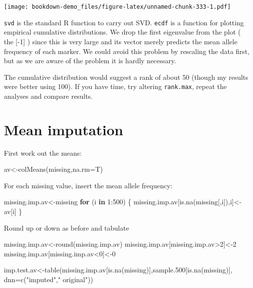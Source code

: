 \documentclass[
]{book}
\newenvironment{Shaded}{\begin{snugshade}}{\end{snugshade}}
\newcommand{\AttributeTok}[1]{\textcolor[rgb]{0.77,0.63,0.00}{#1}}
\newcommand{\ControlFlowTok}[1]{\textcolor[rgb]{0.13,0.29,0.53}{\textbf{#1}}}
\newcommand{\DecValTok}[1]{\textcolor[rgb]{0.00,0.00,0.81}{#1}}
\newcommand{\FloatTok}[1]{\textcolor[rgb]{0.00,0.00,0.81}{#1}}
\newcommand{\FunctionTok}[1]{\textcolor[rgb]{0.00,0.00,0.00}{#1}}
\newcommand{\NormalTok}[1]{#1}
\newcommand{\OtherTok}[1]{\textcolor[rgb]{0.56,0.35,0.01}{#1}}
\newcommand{\SpecialCharTok}[1]{\textcolor[rgb]{0.00,0.00,0.00}{#1}}
\newcommand{\StringTok}[1]{\textcolor[rgb]{0.31,0.60,0.02}{#1}}
\begin{document}
\texttt{[image: bookdown-demo\_files/figure-latex/unnamed-chunk-333-1.pdf]}

\texttt{svd} is the standard R function to carry out SVD. \texttt{ecdf} is a function for plotting empirical cumulative distributions. We drop the first eigenvalue from the plot ( the {[}-1{]} ) since this is very large and its vector merely predicts the mean allele frequency of each marker. We could avoid this problem by rescaling the data first, but as we are aware of the problem it is hardly necessary.

The cumulative distribution would suggest a rank of about 50 (though my results were better using 100). If you have time, try altering \texttt{rank.max}, repeat the analyses and compare results.

\hypertarget{mean-imputation}{%
\section{Mean imputation}\label{mean-imputation}}

First work out the means:

\begin{Shaded}
\begin{Highlighting}[]
\NormalTok{av}\OtherTok{\textless{}{-}}\FunctionTok{colMeans}\NormalTok{(missing,}\AttributeTok{na.rm=}\NormalTok{T)   }
\end{Highlighting}
\end{Shaded}

For each missing value, insert the mean allele frequency:

\begin{Shaded}
\begin{Highlighting}[]
\NormalTok{missing.imp.av}\OtherTok{\textless{}{-}}\NormalTok{missing }
\ControlFlowTok{for}\NormalTok{ (i }\ControlFlowTok{in} \DecValTok{1}\SpecialCharTok{:}\DecValTok{500}\NormalTok{) \{}
\NormalTok{  missing.imp.av[}\FunctionTok{is.na}\NormalTok{(missing[,i]),i]}\OtherTok{\textless{}{-}}\NormalTok{av[i]   }
\NormalTok{\} }
\end{Highlighting}
\end{Shaded}

Round up or down as before and tabulate

\begin{Shaded}
\begin{Highlighting}[]
\NormalTok{missing.imp.av}\OtherTok{\textless{}{-}}\FunctionTok{round}\NormalTok{(missing.imp.av)}
\NormalTok{missing.imp.av[missing.imp.av}\SpecialCharTok{\textgreater{}}\DecValTok{2}\NormalTok{]}\OtherTok{\textless{}{-}}\DecValTok{2}
\NormalTok{missing.imp.av[missing.imp.av}\SpecialCharTok{\textless{}}\DecValTok{0}\NormalTok{]}\OtherTok{\textless{}{-}}\DecValTok{0}

\NormalTok{imp.test.av}\OtherTok{\textless{}{-}}\FunctionTok{table}\NormalTok{(missing.imp.av[}\FunctionTok{is.na}\NormalTok{(missing)],sample}\FloatTok{.500}\NormalTok{[}\FunctionTok{is.na}\NormalTok{(missing)],}
                   \AttributeTok{dnn=}\FunctionTok{c}\NormalTok{(}\StringTok{"imputed"}\NormalTok{,}\StringTok{"       original"}\NormalTok{))}
\end{Highlighting}
\end{Shaded}
\end{document}
